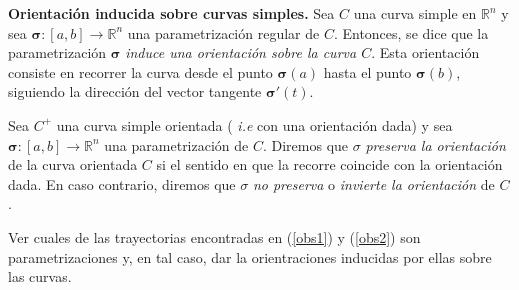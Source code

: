 \begin{definition} \textbf{Orientación inducida sobre  curvas simples.} Sea \( C \) una curva simple en \( \mathbb{R}^n \) y sea  
$\boldsymbol{\sigma} : [a,b] \to \mathbb{R}^n$ una parametrización regular de \( C \).  Entonces, se dice que la parametrización \( \boldsymbol{\sigma} \)  \emph{induce una orientación sobre la curva \( C \)}. Esta orientación consiste en recorrer la curva desde el punto \( \boldsymbol{\sigma}(a) \) hasta el punto \( \boldsymbol{\sigma}(b) \), siguiendo la dirección del vector tangente \( \boldsymbol{\sigma}'(t) \).
\end{definition} 

\begin{definition}\label{orien_pre}
Sea $C^{+}$ una curva simple orientada (\textit{ i.e} con una orientaci\'on dada) y sea $\boldsymbol{\sigma} : [a,b] \to \mathbb{R}^n$ una parametrización  de \( C \). Diremos que  $\sigma$ \textit{preserva la orientación} de la curva orientada \( C \) si el sentido en que la recorre coincide con la orientación dada.  En caso contrario, diremos que  $\sigma$ \textit{ no preserva} o  \textit{invierte la orientación} de $C$. 
\end{definition} 




\begin{tarea}
Ver cuales de las trayectorias encontradas en (\ref{obs1}) y (\ref{obs2}) son parametrizaciones y, en tal caso,  dar la orientraciones inducidas por ellas sobre las curvas.  
\end{tarea}
    
    
    
